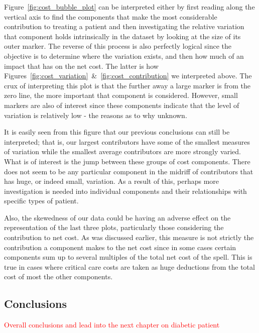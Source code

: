 Figure~\ref{fig:cost_bubble_plot} can be interpreted either by first reading
along the vertical axis to find the components that make the most considerable
contribution to treating a patient and then investigating the relative variation
that component holds intrinsically in the dataset by looking at the size of its
outer marker. The reverse of this process is also perfectly logical since the
objective is to determine where the variation exists, and then how much of an
impact that has on the net cost. The latter is how
Figures~\ref{fig:cost_variation}~\&~\ref{fig:cost_contribution} we interpreted
above. The crux of interpreting this plot is that the further away a large
marker is from the zero line, the more important that component is considered.
However, small markers are also of interest since these components indicate that
the level of variation is relatively low \-- the reasons as to why unknown.

It is easily seen from this figure that our previous conclusions can still be
interpreted; that is, our largest contributors have some of the smallest
measures of variation while the smallest average contributors are more strongly
varied. What is of interest is the jump between these groups of cost components.
There does not seem to be any particular component in the midriff of
contributors that has huge, or indeed small, variation. As a result of this,
perhaps more investigation is needed into individual components and their
relationships with specific types of patient.

Also, the skewedness of our data could be having an adverse effect on the
representation of the last three plots, particularly those considering the
contribution to net cost. As was discussed earlier, this measure is not strictly
the contribution a component makes to the net cost since in some cases certain
components sum up to several multiples of the total net cost of the spell. This
is true in cases where critical care costs are taken as huge deductions from the
total cost of most the other components.

\subsection{Conclusions}

\textcolor{red}{%
    Overall conclusions and lead into the next chapter on diabetic patient
}
